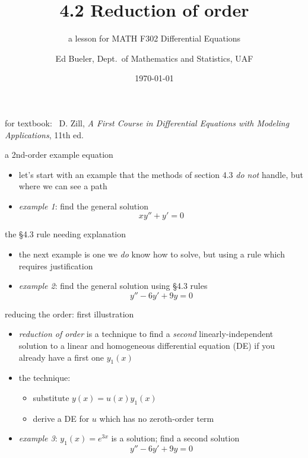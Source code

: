 \documentclass[dvipsnames]{beamer}
\title{4.2 Reduction of order}
\subtitle{a lesson for MATH F302 Differential Equations}
\author{Ed Bueler, Dept.~of Mathematics and Statistics, UAF}
\date{\tiny \today}
\begin{document}


\begin{frame}
\titlepage

\centerline{\tiny for textbook: \, D. Zill, \emph{A First Course in Differential Equations with Modeling Applications}, 11th ed.}
\end{frame}


\begin{frame}{a 2nd-order example equation}

\begin{itemize}
\item let's start with an example that the methods of section 4.3 \emph{do not} handle, but where we can see a path
\item \emph{example 1}: find the general solution
    $$x y'' + y' = 0$$
\end{itemize}

\vspace{50mm}
\end{frame}


\begin{frame}{the \S4.3 rule needing explanation}

\begin{itemize}
\item the next example is one we \emph{do} know how to solve, but using a rule which requires justification
\item \emph{example 2}:  find the general solution using \S4.3 rules
    $$y'' - 6 y' + 9 y = 0$$
\end{itemize}

\vspace{50mm}
\end{frame}


\begin{frame}{reducing the order: first illustration}

\begin{itemize}
\item \emph{reduction of order} is a technique to find a \emph{second} linearly-independent solution to a linear and homogeneous differential equation (DE) if you already have a first one $y_1(x)$
\item the technique:
    \begin{itemize}
    \item substitute $y(x) = u(x) y_1(x)$
    \item derive a DE for $u$ which has no zeroth-order term
    \end{itemize}
\item \emph{example 3}:  $y_1(x)=e^{3x}$ is a solution; find a second solution
    $$y'' - 6 y' + 9 y = 0$$
\end{itemize}

\vspace{50mm}
\end{frame}
\end{document}

